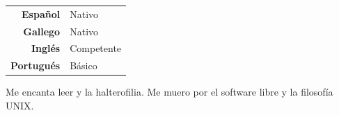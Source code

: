 \documentclass[9pt]{developercv} %
\begin{document}
\begin{minipage}[t]{0.3\textwidth}
  \vspace{-\baselineskip} %


  \begin{tabular}{rl}
  \textbf{Español}   & Nativo \\
  \textbf{Gallego}   & Nativo \\
  \textbf{Inglés}    & Competente \\
  \textbf{Portugués} & Básico
  \end{tabular}
\end{minipage}
\hfill
\begin{minipage}[t]{0.3\textwidth}
  \vspace{-\baselineskip} %


  Me encanta leer y la halterofilia. Me muero por el software libre y la filosofía UNIX.
\end{minipage}
\hfill
\begin{minipage}[t]{0.3\textwidth}
  \vspace{-\baselineskip} %

    \begin{barchart}{5.5}
    \end{barchart}
\end{minipage}

\end{document}

